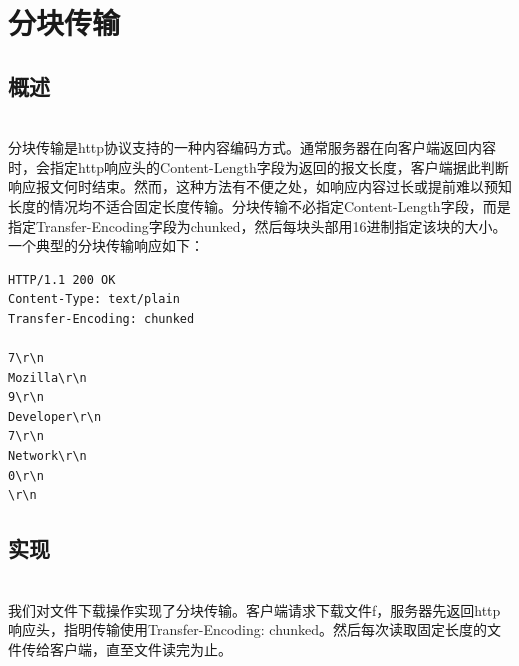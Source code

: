 \usepackage{listings}  %

\section{分块传输}
\subsection{概述}
\ \\
分块传输是http协议支持的一种内容编码方式。通常服务器在向客户端返回内容时，会指定http响应头的Content-Length字段为返回的报文长度，客户端据此判断响应报文何时结束。然而，这种方法有不便之处，如响应内容过长或提前难以预知长度的情况均不适合固定长度传输。分块传输不必指定Content-Length字段，而是指定Transfer-Encoding字段为chunked，然后每块头部用16进制指定该块的大小。一个典型的分块传输响应如下：
\begin{lstlisting}[caption = chunked encoding, label = encoding]
HTTP/1.1 200 OK
Content-Type: text/plain
Transfer-Encoding: chunked

7\r\n
Mozilla\r\n
9\r\n
Developer\r\n
7\r\n
Network\r\n
0\r\n
\r\n
\end{lstlisting}

\subsection{实现}
\ \\
我们对文件下载操作实现了分块传输。客户端请求下载文件f，服务器先返回http响应头，指明传输使用Transfer-Encoding: chunked。然后每次读取固定长度的文件传给客户端，直至文件读完为止。

